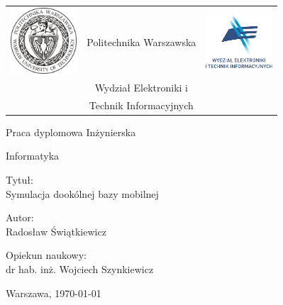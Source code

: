 \begin{titlepage}
\pagestyle{empty}

\noindent
\begin{large}
\begin{table}[t]
\centering
\begin{tabular}[t]{lcr}
 \includegraphics[width=70pt,height=70pt]{graphics/pw_logo.jpg} & Politechnika Warszawska & \includegraphics[width=70pt,height=70pt]{graphics/weiti_logo.pdf}\\
& Wydział Elektroniki i & \\
& Technik Informacyjnych &
\end{tabular}
\end{table}

\begin{center}Praca dyplomowa Inżynierska\end{center}
\begin{center}Informatyka\end{center}\end{large}

\vfill
\begin{center}
\large
Tytuł: \\
\Huge
Symulacja dookólnej bazy mobilnej
\end{center}

\vfill
\begin{center}
\large
Autor: \\
\Large
Radosław Świątkiewicz
\end{center}

\vfill
\begin{center}
\large
Opiekun naukowy: \\
\Large
dr hab. inż. Wojciech Szynkiewicz
\end{center}

\vfill
\begin{center}
Warszawa, \today
\end{center}

\end{titlepage}
